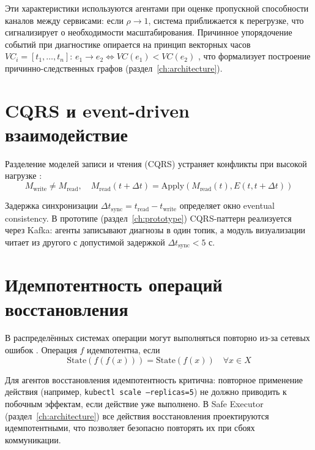 Эти характеристики используются агентами при оценке пропускной способности каналов между сервисами: если $\rho \to 1$, система приближается к перегрузке, что сигнализирует о необходимости масштабирования. Причинное упорядочение событий при диагностике опирается на принцип векторных часов $VC_i = [t_1, \ldots, t_n]$: $e_1 \to e_2 \Leftrightarrow VC(e_1) < VC(e_2)$ \cite{lamport_distributed_systems}, что формализует построение причинно-следственных графов (раздел~\ref{ch:architecture}).

\section{CQRS и event-driven взаимодействие}

Разделение моделей записи и чтения (CQRS) устраняет конфликты при высокой нагрузке \cite{cqrs_pattern,event_sourcing}:
\begin{equation}
M_{\text{write}} \neq M_{\text{read}}, \quad M_{\text{read}}(t+\Delta t) = \text{Apply}(M_{\text{read}}(t), E(t, t+\Delta t))
\label{eq:cqrs_sync}
\end{equation}

Задержка синхронизации $\Delta t_{\text{sync}} = t_{\text{read}} - t_{\text{write}}$ определяет окно eventual consistency. В прототипе (раздел~\ref{ch:prototype}) CQRS-паттерн реализуется через Kafka: агенты записывают диагнозы в один топик, а модуль визуализации читает из другого с допустимой задержкой $\Delta t_{\text{sync}} < 5$ с.

\section{Идемпотентность операций восстановления}

В распределённых системах операции могут выполняться повторно из-за сетевых ошибок \cite{kleppmann_designing_data}. Операция $f$ идемпотентна, если
\begin{equation}
\text{State}(f(f(x))) = \text{State}(f(x)) \quad \forall x \in X
\label{eq:idempotency}
\end{equation}

Для агентов восстановления идемпотентность критична: повторное применение действия (например, \texttt{kubectl scale --replicas=5}) не должно приводить к побочным эффектам, если действие уже выполнено. В Safe Executor (раздел~\ref{ch:architecture}) все действия восстановления проектируются идемпотентными, что позволяет безопасно повторять их при сбоях коммуникации.


